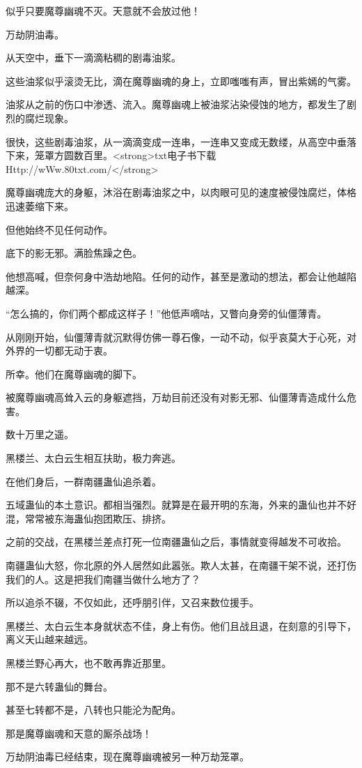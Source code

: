 \begin{this_body}
似乎只要魔尊幽魂不灭。天意就不会放过他！

万劫阴油毒。

从天空中，垂下一滴滴粘稠的剧毒油浆。

这些油浆似乎滚烫无比，滴在魔尊幽魂的身上，立即嗤嗤有声，冒出紫嫣的气雾。

油浆从之前的伤口中渗透、流入。魔尊幽魂上被油浆沾染侵蚀的地方，都发生了剧烈的腐烂现象。

很快，这些剧毒油浆，从一滴滴变成一连串，一连串又变成无数缕，从高空中垂落下来，笼罩方圆数百里。<strong>txt电子书下载Http://wWw.80txt.com/</strong>

魔尊幽魂庞大的身躯，沐浴在剧毒油浆之中，以肉眼可见的速度被侵蚀腐烂，体格迅速萎缩下来。

但他始终不见任何动作。

底下的影无邪。满脸焦躁之色。

他想高喊，但奈何身中浩劫地陷。任何的动作，甚至是激动的想法，都会让他越陷越深。

“怎么搞的，你们两个都成这样子！”他低声嘀咕，又瞥向身旁的仙僵薄青。

从刚刚开始，仙僵薄青就沉默得仿佛一尊石像，一动不动，似乎哀莫大于心死，对外界的一切都无动于衷。

所幸。他们在魔尊幽魂的脚下。

被魔尊幽魂高耸入云的身躯遮挡，万劫目前还没有对影无邪、仙僵薄青造成什么危害。

数十万里之遥。

黑楼兰、太白云生相互扶助，极力奔逃。

在他们身后，一群南疆蛊仙追杀着。

五域蛊仙的本土意识。都相当强烈。就算是在最开明的东海，外来的蛊仙也并不好混，常常被东海蛊仙抱团欺压、排挤。

之前的交战，在黑楼兰差点打死一位南疆蛊仙之后，事情就变得越发不可收拾。

南疆蛊仙大怒，你北原的外人居然如此嚣张。欺人太甚，在南疆干架不说，还打伤我们的人。这是把我们南疆当做什么地方了？

所以追杀不辍，不仅如此，还呼朋引伴，又召来数位援手。

黑楼兰、太白云生本身就状态不佳，身上有伤。他们且战且退，在刻意的引导下，离义天山越来越远。

黑楼兰野心再大，也不敢再靠近那里。

那不是六转蛊仙的舞台。

甚至七转都不是，八转也只能沦为配角。

那是魔尊幽魂和天意的厮杀战场！

万劫阴油毒已经结束，现在魔尊幽魂被另一种万劫笼罩。


\end{this_body}
